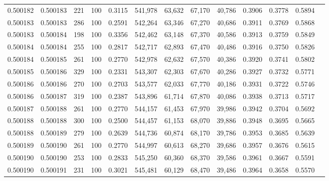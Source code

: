 \begin{tabular}{rrrrrrrrrrrrr}
0.500182 & 0.500183 &   221 & 100 &                                     0.3115 & 541,978 &  63,632 &  67,170 &  40,786 & 0.3906 & 0.3778 & 0.5894 \\
0.500183 & 0.500183 &   286 & 100 &                                     0.2591 & 542,264 &  63,346 &  67,270 &  40,686 & 0.3911 & 0.3769 & 0.5868 \\
0.500183 & 0.500184 &   198 & 100 &                                     0.3356 & 542,462 &  63,148 &  67,370 &  40,586 & 0.3913 & 0.3759 & 0.5849 \\
0.500184 & 0.500184 &   255 & 100 &                                     0.2817 & 542,717 &  62,893 &  67,470 &  40,486 & 0.3916 & 0.3750 & 0.5826 \\
0.500184 & 0.500185 &   261 & 100 &                                     0.2770 & 542,978 &  62,632 &  67,570 &  40,386 & 0.3920 & 0.3741 & 0.5802 \\
0.500185 & 0.500186 &   329 & 100 &                                     0.2331 & 543,307 &  62,303 &  67,670 &  40,286 & 0.3927 & 0.3732 & 0.5771 \\
0.500186 & 0.500186 &   270 & 100 &                                     0.2703 & 543,577 &  62,033 &  67,770 &  40,186 & 0.3931 & 0.3722 & 0.5746 \\
0.500186 & 0.500187 &   319 & 100 &                                     0.2387 & 543,896 &  61,714 &  67,870 &  40,086 & 0.3938 & 0.3713 & 0.5717 \\
0.500187 & 0.500188 &   261 & 100 &                                     0.2770 & 544,157 &  61,453 &  67,970 &  39,986 & 0.3942 & 0.3704 & 0.5692 \\
0.500188 & 0.500188 &   300 & 100 &                                     0.2500 & 544,457 &  61,153 &  68,070 &  39,886 & 0.3948 & 0.3695 & 0.5665 \\
0.500188 & 0.500189 &   279 & 100 &                                     0.2639 & 544,736 &  60,874 &  68,170 &  39,786 & 0.3953 & 0.3685 & 0.5639 \\
0.500189 & 0.500190 &   261 & 100 &                                     0.2770 & 544,997 &  60,613 &  68,270 &  39,686 & 0.3957 & 0.3676 & 0.5615 \\
0.500190 & 0.500190 &   253 & 100 &                                     0.2833 & 545,250 &  60,360 &  68,370 &  39,586 & 0.3961 & 0.3667 & 0.5591 \\
0.500190 & 0.500191 &   231 & 100 &                                     0.3021 & 545,481 &  60,129 &  68,470 &  39,486 & 0.3964 & 0.3658 & 0.5570 \\

\end{tabular}
